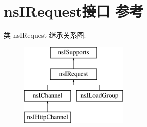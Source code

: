 \hypertarget{interfacens_i_request}{}\section{ns\+I\+Request接口 参考}
\label{interfacens_i_request}
类 ns\+I\+Request 继承关系图\+:\begin{figure}[H]
\begin{center}
\leavevmode
\includegraphics[height=4.000000cm]{interfacens_i_request}
\end{center}
\end{figure}
